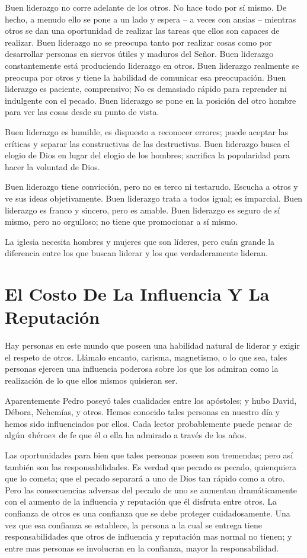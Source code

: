 \documentclass[12pt, twoside, openright]{book}
\begin{document}
Buen liderazgo no corre adelante de los otros. No hace todo por sí mismo. De hecho, a menudo ello se pone a un lado y espera – a veces con ansias – mientras otros se dan una oportunidad de realizar las tareas que ellos son capaces de realizar. Buen liderazgo no se preocupa tanto por realizar cosas como por desarrollar personas en siervos útiles y maduros del Señor. Buen liderazgo constantemente está produciendo liderazgo en otros.
Buen liderazgo realmente se preocupa por otros y tiene la habilidad de comunicar esa preocupación. Buen liderazgo es paciente, comprensivo; No es demasiado rápido para reprender ni indulgente con el pecado. Buen liderazgo se pone en la posición del otro hombre para ver las cosas desde su punto de vista.

Buen liderazgo es humilde, es dispuesto a reconocer errores; puede aceptar las críticas y separar las constructivas de las destructivas. Buen liderazgo busca el elogio de Dios en lugar del elogio de los hombres; sacrifica la popularidad para hacer la voluntad de Dios. 

Buen liderazgo tiene convicción, pero no es terco ni testarudo. Escucha a otros y ve sus ideas objetivamente. Buen liderazgo trata a todos igual; es imparcial. Buen liderazgo es franco y sincero, pero es amable.
Buen liderazgo es seguro de sí mismo, pero no orgulloso; no tiene que promocionar a sí mismo.

La iglesia necesita hombres y mujeres que son líderes, pero cuán grande la diferencia entre los que buscan liderar y los que verdaderamente lideran.

\section{El Costo De La Influencia Y La Reputación}
Hay personas en este mundo que poseen una habilidad natural de liderar y exigir el respeto de otros. Llámalo encanto, carisma, magnetismo, o lo que sea, tales personas ejercen una influencia poderosa sobre los que los admiran como la realización de lo que ellos mismos quisieran ser.

Aparentemente Pedro poseyó tales cualidades entre los apóstoles; y hubo David, Débora, Nehemías, y otros. Hemos conocido tales personas en nuestro día y hemos sido influenciados por ellos. Cada lector probablemente puede pensar de algún «héroe» de fe que él o ella ha admirado a través de los años.

Las oportunidades para bien que tales personas poseen son tremendas; pero así también son las responsabilidades. Es verdad que pecado es pecado, quienquiera que lo cometa; que el pecado separará a uno de Dios tan rápido como a otro. Pero las consecuencias adversas del pecado de uno se aumentan dramáticamente con el aumento de la influencia y reputación que él disfruta entre otros. La confianza de otros es una confianza que se debe proteger cuidadosamente. Una vez que esa confianza se establece, la persona a la cual se entrega tiene responsabilidades que otros de influencia y reputación mas normal no tienen; y entre mas personas se involucran en la confianza, mayor la responsabilidad.
\end{document}
